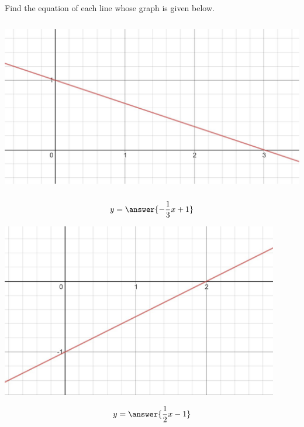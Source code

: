 \documentclass{ximera}
\begin{document}
\begin{problem}\label{prob:160hom4prob4}
Find the equation of each line whose graph is given below.

\begin{image}
   \includegraphics[height=3in]{160H4pic2.jpg}
 \end{image}
 
 $$y=\answer{-\frac{1}{3}x+1}$$
 
 \begin{image}
   \includegraphics[height=3in]{160H4pic3.jpg}
 \end{image}
 
 $$y=\answer{\frac{1}{2}x-1}$$

\end{problem}
\end{document}
